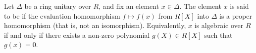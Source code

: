 Let $\Delta$ be a ring unitary over $R$, and fix an element $x \in \Delta$. The element $x$ is said to be  if the evaluation homomorphism $f \mapsto f(x)$ from $R[X]$ into $\Delta$ is a proper homomorphism (that is, not an isomorphism). Equivalently, $x$ is algebraic over $R$ if and only if there exists a non-zero polynomial $g(X) \in R[X]$ such that $g(x) = 0$.
